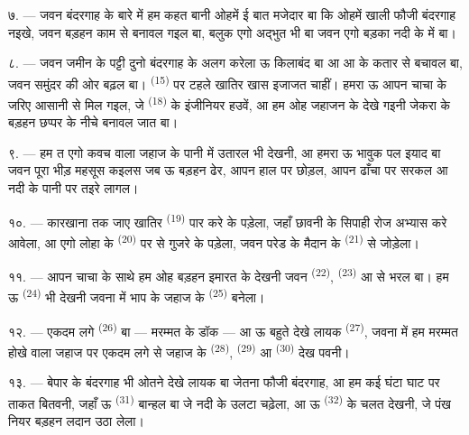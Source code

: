 \VUsaut{3.0mm}
\VUsaut{3.0mm}

७. --- जवन बंदरगाह के बारे में हम कहत बानी ओहमें ई बात मजेदार बा कि
ओहमें खाली फौजी बंदरगाह नइखे, जवन बड़हन काम से बनावल गइल बा, बलुक एगो
अद्भुत  भी बा जवन एगो बड़का नदी के
 में बा।

८. --- जवन जमीन के पट्टी दुनो बंदरगाह के अलग करेला ऊ किलाबंद बा आ
 आ  के कतार से बचावल बा, जवन समुंदर की ओर
बढ़ल बा।  \textsuperscript{(15)} पर टहले खातिर खास इजाजत
चाहीं। हमरा ऊ आपन चाचा के जरिए आसानी से मिल गइल, जे  \textsuperscript{(18)} के इंजीनियर हउवें, आ हम ओह जहाजन के
देखे गइनी जेकरा के बड़हन छप्पर के नीचे बनावल जात बा।

९. --- हम त एगो कवच वाला जहाज के पानी में उतारल भी देखनी, आ हमरा ऊ
भावुक पल इयाद बा जवन पूरा भीड़ महसूस कइलस जब ऊ बड़हन ढेर, आपन हाल पर
छोड़ल, आपन ढाँचा पर सरकल आ नदी के पानी पर तइरे लागल।

१०. --- कारखाना तक जाए खातिर  \textsuperscript{(19)}
पार करे के पड़ेला, जहाँ छावनी के सिपाही रोज अभ्यास करे आवेला, आ एगो
लोहा के  \textsuperscript{(20)} पर से गुजरे के पड़ेला, जवन
परेड के मैदान के  \textsuperscript{(21)} से जोड़ेला।

\VUsaut{3.0mm}
\VUsaut{3.0mm}

११. --- आपन चाचा के साथे हम ओह बड़हन इमारत के देखनी जवन 
\textsuperscript{(22)},  \textsuperscript{(23)} आ
 से भरल बा। हम ऊ 
\textsuperscript{(24)} भी देखनी जवना में भाप के जहाज के 
\textsuperscript{(25)} बनेला।

१२. --- एकदम लगे  \textsuperscript{(26)} बा — मरम्मत के डॉक
— आ ऊ बहुते देखे लायक  \textsuperscript{(27)}, जवना में
हम मरम्मत होखे वाला जहाज पर एकदम लगे से जहाज के 
\textsuperscript{(28)},  \textsuperscript{(29)} आ
 \textsuperscript{(30)} देख पवनी।

१३. --- बेपार के बंदरगाह भी ओतने देखे लायक बा जेतना फौजी बंदरगाह, आ हम
कई घंटा घाट पर ताकत बितवनी, जहाँ ऊ 
\textsuperscript{(31)} बान्हल बा जे नदी के उलटा चढ़ेला, आ ऊ
 \textsuperscript{(32)} के चलत देखनी, जे पंख नियर
बड़हन लदान उठा लेला।

